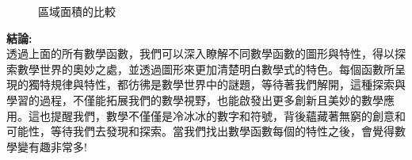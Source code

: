 \documentclass[12pt, a4paper]{article}
\begin{document}
\begin{enumerate}
\begin{figure}[H]
    \centering
    \caption{區域面積的比較}
    \label{fig:parallel2_6}
\end{figure}

\end{enumerate}



\textbf{結論\;:}\\
透過上面的所有數學函數，我們可以深入瞭解不同數學函數的圖形與特性，得以探索數學世界的奧妙之處，並透過圖形來更加清楚明白數學式的特色。每個函數所呈現的獨特規律與特性，都彷彿是數學世界中的謎題，等待著我們解開，這種探索與學習的過程，不僅能拓展我們的數學視野，也能啟發出更多創新且美妙的數學應用。這也提醒我們，數學不僅僅是冷冰冰的數字和符號，背後蘊藏著無窮的創意和可能性，等待我們去發現和探索。當我們找出數學函數每個的特性之後，會覺得數學變有趣非常多\;!
\end{document}
